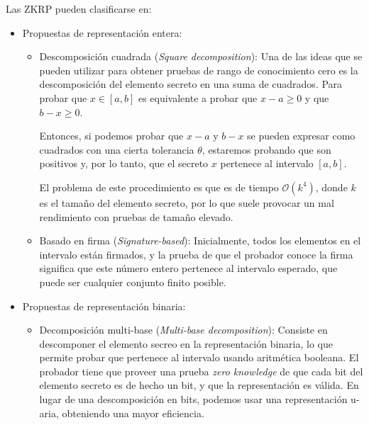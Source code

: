 Las ZKRP pueden clasificarse en:
\begin{itemize}
    \item Propuestas de representación entera:
    \begin{itemize}
        \item Descomposición cuadrada (\emph{Square decomposition}): 
        Una de las ideas que se pueden utilizar para obtener pruebas de rango de conocimiento cero es la descomposición del elemento secreto en una suma de cuadrados. Para probar que $x \in [a, b]$ es equivalente a probar que $x - a \geq 0$ y que $b - x \geq 0$.

        Entonces, si podemos probar que $x - a$ y $b - x$ se pueden expresar como cuadrados con una cierta tolerancia $\theta$, estaremos probando que son positivos y, por lo tanto, que el secreto $x$ pertenece al intervalo $[a, b]$.

        El problema de este procedimiento es que es de tiempo $\mathcal{O}(k^{4})$, donde $k$ es el tamaño del elemento secreto, por lo que suele provocar un mal rendimiento con pruebas de tamaño elevado.
        
        \item Basado en firma (\emph{Signature-based}):
        Inicialmente, todos los elementos en el intervalo están firmados, y la prueba de que el probador conoce la firma significa que este número entero pertenece al intervalo esperado, que puede ser cualquier conjunto finito posible.
    \end{itemize}
    \item Propuestas de representación binaria:
    \begin{itemize}
        \item Decomposición multi-base (\emph{Multi-base decomposition}):
        Consiste en descomponer el elemento secreo en la representación binaria, lo que permite probar que pertenece al intervalo usando aritmética booleana. El probador tiene que proveer una prueba \emph{zero knowledge} de que cada bit del elemento secreto es de hecho un bit, y que la representación es válida. En lugar de una descomposición en bits, podemos usar una representación u-aria, obteniendo una mayor eficiencia.
        

\end{itemize}
\end{itemize}
